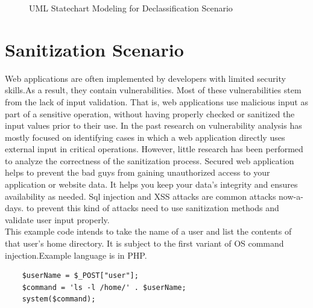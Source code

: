 \begin{figure}[htbp]
	\centering
	\label{declassification_scenario}
	\caption{UML Statechart Modeling for Declassification Scenario}
\end{figure}


\section{Sanitization Scenario}
Web applications are often implemented by developers with limited security skills.As a result, they
contain vulnerabilities. Most of these vulnerabilities stem
from the lack of input validation. That is, web applications
use malicious input as part of a sensitive operation, without having properly checked or sanitized the input values
prior to their use.
In the past research on vulnerability analysis has mostly focused on identifying cases in which a web application directly uses external input in critical operations. However,
little research has been performed to analyze the correctness of the sanitization process. Secured web application helps to prevent the bad guys from gaining unauthorized access to your application or website data. It helps you keep your data's integrity and ensures availability as needed. Sql injection and XSS attacks are common attacks now-a-days. to prevent this kind of attacks need to use sanitization methods and validate user input properly.\\
This example code intends to take the name of a user and list the contents of that user's home directory. It is subject to the first variant of OS command injection.Example language is in PHP.

\begin{lstlisting}
	$userName = $_POST["user"];
	$command = 'ls -l /home/' . $userName;
	system($command);
\end{lstlisting} 

